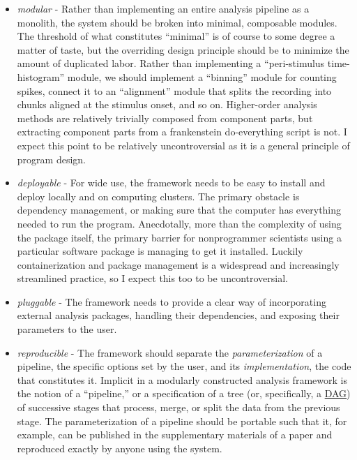 \documentclass{article}
\begin{document}
\begin{itemize}
\item
  \emph{modular} - Rather than implementing an entire analysis pipeline
  as a monolith, the system should be broken into minimal, composable
  modules. The threshold of what constitutes ``minimal'' is of course to
  some degree a matter of taste, but the overriding design principle
  should be to minimize the amount of duplicated labor. Rather than
  implementing a ``peri-stimulus time-histogram'' module, we should
  implement a ``binning'' module for counting spikes, connect it to an
  ``alignment'' module that splits the recording into chunks aligned at
  the stimulus onset, and so on. Higher-order analysis methods are
  relatively trivially composed from component parts, but extracting
  component parts from a frankenstein do-everything script is not. I
  expect this point to be relatively uncontroversial as it is a general
  principle of program design.
\item
  \emph{deployable} - For wide use, the framework needs to be easy to
  install and deploy locally and on computing clusters. The primary
  obstacle is dependency management, or making sure that the computer
  has everything needed to run the program. Anecdotally, more than the
  complexity of using the package itself, the primary barrier for
  nonprogrammer scientists using a particular software package is
  managing to get it installed. Luckily containerization and package
  management is a widespread and increasingly streamlined practice, so I
  expect this too to be uncontroversial.
\item
  \emph{pluggable} - The framework needs to provide a clear way of
  incorporating external analysis packages, handling their dependencies,
  and exposing their parameters to the user.
\item
  \emph{reproducible} - The framework should separate the
  \emph{parameterization} of a pipeline, the specific options set by the
  user, and its \emph{implementation}, the code that constitutes it.
  Implicit in a modularly constructed analysis framework is the notion
  of a ``pipeline,'' or a specification of a tree (or, specifically, a
  \href{https://en.wikipedia.org/wiki/Directed_acyclic_graph}{DAG}) of
  successive stages that process, merge, or split the data from the
  previous stage. The parameterization of a pipeline should be portable
  such that it, for example, can be published in the supplementary
  materials of a paper and reproduced exactly by anyone using the
  system.
\end{itemize}
\end{document}
